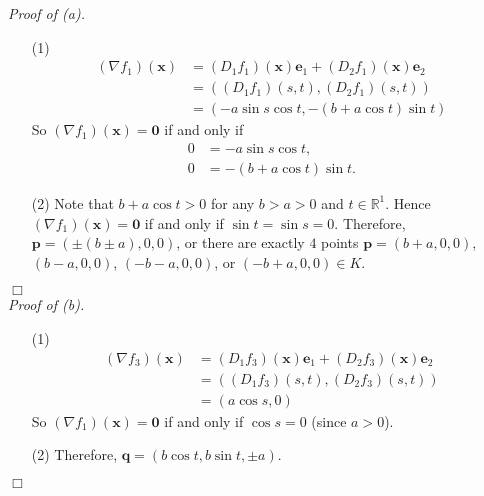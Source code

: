 \documentclass{article}
\begin{document}
\emph{Proof of (a).}
\begin{enumerate}
\item[(1)]
  \begin{align*}
    (\nabla f_1)(\mathbf{x})
    &= (D_1 f_1)(\mathbf{x})\mathbf{e}_1 + (D_2 f_1)(\mathbf{x})\mathbf{e}_2 \\
    &= ((D_1 f_1)(s,t), (D_2 f_1)(s,t)) \\
    &= (-a \sin s \cos t, -(b + a \cos t) \sin t)
  \end{align*}
  So
  $(\nabla f_1)(\mathbf{x}) = \mathbf{0}$
  if and only if
  \begin{align*}
    0 &= -a \sin s \cos t, \\
    0 &= -(b + a \cos t) \sin t.
  \end{align*}

\item[(2)]
  Note that $b + a \cos t > 0$ for any $b > a > 0$ and $t \in \mathbb{R}^1$.
  Hence $(\nabla f_1)(\mathbf{x}) = \mathbf{0}$ if and only if $\sin t = \sin s = 0$.
  Therefore,
  $\mathbf{p} = (\pm (b \pm a),0,0)$,
  or there are exactly $4$ points
  $\mathbf{p} = (b + a, 0, 0)$,
  $(b - a, 0, 0)$,
  $(-b - a, 0, 0)$, or
  $(-b + a, 0, 0) \in K$.
\end{enumerate}
$\Box$ \\



\emph{Proof of (b).}
\begin{enumerate}
\item[(1)]
  \begin{align*}
    (\nabla f_3)(\mathbf{x})
    &= (D_1 f_3)(\mathbf{x})\mathbf{e}_1 + (D_2 f_3)(\mathbf{x})\mathbf{e}_2 \\
    &= ((D_1 f_3)(s,t), (D_2 f_3)(s,t)) \\
    &= (a \cos s, 0)
  \end{align*}
  So
  $(\nabla f_1)(\mathbf{x}) = \mathbf{0}$
  if and only if $\cos s = 0$ (since $a > 0$).

\item[(2)]
  Therefore,
  $\mathbf{q} = (b\cos t, b\sin t, \pm a)$.
\end{enumerate}
$\Box$ \\
\end{document}

